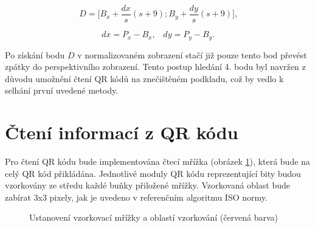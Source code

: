 \begin{equation}
  D = \bigg[ B_{x} + \frac{dx}{s}(s + 9) ; B_{y} + \frac{dy}{s}(s + 9)
  \bigg]\mbox{,}
\end{equation}

\begin{equation}
  dx = P_{x} - B_{x}\mbox{,} \quad dy = P_{y} - B_{y}\mbox{.}
\end{equation}

Po získání bodu $D$ v normalizovaném zobrazení stačí již pouze tento bod převést
zpátky do perspektivního zobrazení. Tento postup hledání 4. bodu byl navržen 
z důvodu umožnění čtení QR kódů na znečištěném podkladu, což by vedlo k selhání
první uvedené metody.

\clearpage
\section{Čtení informací z QR kódu}
\label{cteniQRKoduMrizka}

Pro čtení QR kódu bude implementována čtecí mřížka (obrázek \ref{SamplingGrid}),
která bude na celý QR kód přikládána. Jednotlivé moduly  QR kódu reprezentující bity budou
vzorkovány ze středu každé buňky přiložené mřížky. Vzorkovaná oblast bude zabírat
3x3 pixely, jak je uvedeno v referenčním algoritmu ISO normy.

\begin{figure}[H]
  \begin{center}
    \caption{Ustanovení vzorkovací mřížky a oblastí vzorkování (červená barva)}
    \label{SamplingGrid}
  \end{center}
\end{figure}

